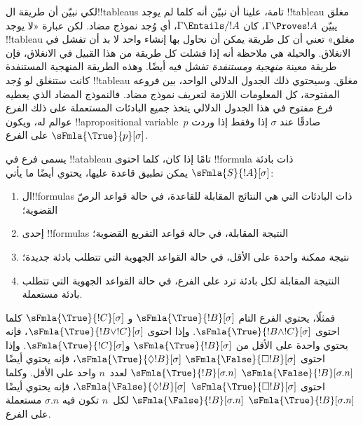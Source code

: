 \documentclass[../../../include/open-logic-section]{subfiles}
\begin{document}


\begin{explain}
  لكي نبيّن أن طريقة ال!!{tableau}s تامة، علينا أن نبيّن أنه كلما لم
  يوجد !!{tableau} مغلق يبيّن $\Gamma \Proves !A$، كان
  $\Gamma \Entails/ !A$، أي وُجد نموذج مضاد. لكن عبارة «لا يوجد
  !!{tableau} مغلق» تعني أن كل طريقة يمكن أن نحاول بها إنشاء واحد لا
  بد أن تفشل في الانغلاق. والحيلة هي ملاحظة أنه إذا فشلت كل طريقة من
  هذا القبيل في الانغلاق، فإن طريقة معينة \emph{منهجية ومستنفدة} تفشل
  فيه أيضًا. وهذه الطريقة المنهجية المستنفدة كانت ستنغلق لو وُجد
  !!{tableau} مغلق. وسيحتوي ذلك الجدول الدلالي الواحد، بين فروعه
  المفتوحة، كل المعلومات اللازمة لتعريف نموذج مضاد. فالنموذج المضاد
  الذي يعطيه فرع مفتوح في هذا الجدول الدلالي يتخذ جميع البادئات
  المستعملة على ذلك الفرع عوالم له، ويكون !!a{propositional
    variable}~$p$ صادقًا عند $\sigma$ إذا وفقط إذا وردت
  $\sFmla{\True}{p}[\sigma]$ على الفرع.
\end{explain}

\begin{defn}
  يسمى فرع في !!a{tableau} تامًا إذا كان، كلما احتوى !!{formula} ذات
  بادئة $\sFmla{S}{!A}[\sigma]$ يمكن تطبيق قاعدة عليها، يحتوي أيضًا
  ما يأتي:
  \begin{enumerate}
    \item ال!!{formula}s ذات البادئات التي هي النتائج المقابلة
      للقاعدة، في حالة قواعد الرصّ القضوية؛
    \item إحدى !!{formula}s النتيجة المقابلة، في حالة قواعد التفريع
      القضوية؛
    \item نتيجة ممكنة واحدة على الأقل، في حالة القواعد الجهوية التي
      تتطلب بادئة جديدة؛
    \item النتيجة المقابلة لكل بادئة ترد على الفرع، في حالة القواعد
      الجهوية التي تتطلب بادئة مستعملة.
  \end{enumerate}
\end{defn}

\begin{explain}
فمثلًا، يحتوي الفرع التام $\sFmla{\True}{!B}[\sigma]$ و
$\sFmla{\True}{!C}[\sigma]$ كلما احتوى
$\sFmla{\True}{!B \land !C}[\sigma]$. وإذا احتوى
$\sFmla{\True}{!B \lor !C}[\sigma]$، فإنه يحتوي واحدة على الأقل من
$\sFmla{\True}{!B}[\sigma]$ و$\sFmla{\True}{!C}[\sigma]$. وإذا احتوى
 {$\sFmla{\False}{\Box !B}[\sigma]$}
{$\sFmla{\True}{\Diamond !B}[\sigma]$}، فإنه يحتوي أيضًا
 {$\sFmla{\False}{!B}[\sigma.n]$}
{$\sFmla{\True}{!B}[\sigma.n]$} لعدد~$n$ واحد على الأقل. وكلما احتوى
 {$\sFmla{\True}{\Box !B}[\sigma]$}
{$\sFmla{\False}{\Diamond !B}[\sigma]$}، فإنه يحتوي أيضًا
 {$\sFmla{\True}{!B}[\sigma.n]$}
{$\sFmla{\False}{!B}[\sigma.n]$} لكل~$n$ تكون فيه $\sigma.n$
مستعملة على الفرع.
\end{explain}
\end{document}
